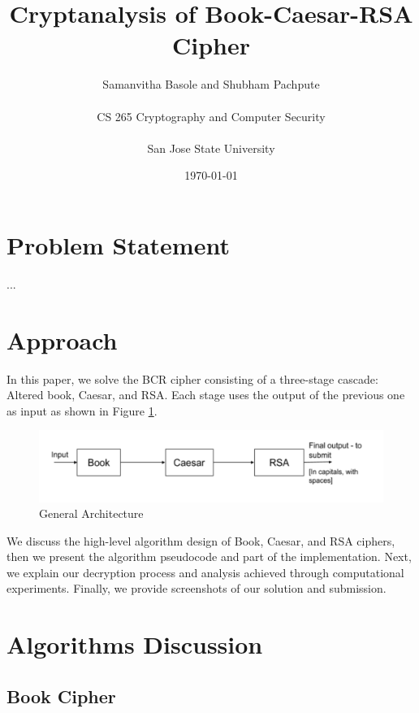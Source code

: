 \documentclass[12pt]{article}
\title{Cryptanalysis of Book-Caesar-RSA Cipher}
\author{Samanvitha Basole and Shubham Pachpute\\
\\
CS 265 Cryptography and Computer Security\\
\\
San Jose State University
}
\date{\today}
\begin{document}
\maketitle

\section{Problem Statement}
...


\section{Approach}
In this paper, we solve the BCR cipher consisting of a three-stage cascade: Altered book, Caesar, and RSA. Each stage uses the output of the previous one as input as shown in Figure \ref{fig:arch}.
\begin{figure}[h]
  \includegraphics[scale=0.8]{3_stage}
  \caption{General Architecture}
  \label{fig:arch}
\end{figure}
We discuss the high-level algorithm design of Book, Caesar, and RSA ciphers, then we present the algorithm pseudocode and part of the implementation. Next, we explain our decryption process and analysis achieved through computational experiments. Finally, we provide screenshots of our solution and submission.


\section{Algorithms Discussion}
\subsection{Book Cipher}
\end{document}
